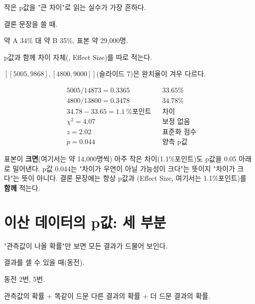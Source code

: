 \begin{inbrief}
  \item[Why] 작은 p값을 "큰 차이"로 읽는 실수가 가장 흔하다.
  \item[When] 결론 문장을 쓸 때.
  \item[Where] 약 A 34\% 대 약 B 35\%, 표본 약 29,000명.
  \item[How] p값과 함께 차이 자체(, Effect Size)를 따로
             적는다.
\end{inbrief}

$[[5005,9868],[4800,9000]]$(슬라이드 7)은 완치율이
겨우 다르다.

\begin{align*}
  &5005/14873 = 0.3365 && \text{33.65\%}\\
  &4800/13800 = 0.3478 && \text{34.78\%}\\
  &34.78 - 33.65 = 1.1\ \%\text{포인트} && \text{차이}\\
  &\chi^2 = 4.07 && \text{보정 없음}\\
  &z = 2.02 && \text{표준화 점수}\\
  &p = 0.044 && \text{양측 p값}
\end{align*}

\begin{pitfall}
표본이 \textbf{크면}(여기서는 약 14,000명씩) 아주 작은 차이(1.1\%포인트)도
p값을 0.05 아래로 밀어낸다. p값 0.044는 "차이가 우연이 아닐 가능성이
크다"는 뜻이지 "차이가 크다"는 뜻이 아니다. 결론 문장에는 항상 p값과
(Effect Size, 여기서는 1.1\%포인트)를 \textbf{함께} 적는다.
\end{pitfall}

\section{이산 데이터의 p값: 세 부분}
\label{sec:pv-discrete}

\begin{inbrief}
  \item[Why] "관측값이 나올 확률"만 보면 모든 결과가 드물어 보인다.
  \item[When] 결과를 셀 수 있을 때(동전).
  \item[Where] 동전 2번, 5번.
  \item[How] 관측값의 확률 $+$ 똑같이 드문 다른 결과의 확률 $+$ 더 드문
             결과의 확률.
\end{inbrief}

